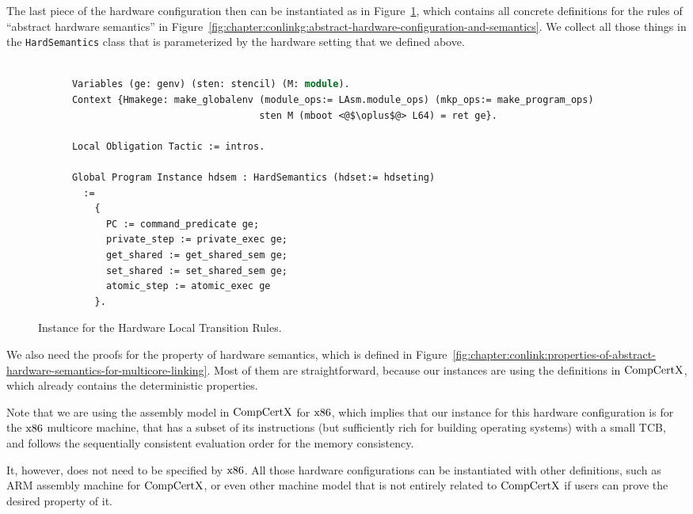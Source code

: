 The last piece of the hardware configuration then can be instantiated as in Figure~\ref{fig:chapter:certikos:hardware-local-step-transition-rules},
which contains all concrete definitions for the rules of ``abstract hardware semantics'' in  Figure~\ref{fig:chapter:conlinkg:abstract-hardware-configuration-and-semantics}.
We collect all those things in the \lstinline$HardSemantics$ class that is parameterized by the hardware setting that we defined above. 
\begin{figure}
\begin{lstlisting}[language=Caml]
      
      Variables (ge: genv) (sten: stencil) (M: module).
      Context {Hmakege: make_globalenv (module_ops:= LAsm.module_ops) (mkp_ops:= make_program_ops) 
                                       sten M (mboot <@$\oplus$@> L64) = ret ge}.
      
      Local Obligation Tactic := intros.
      
      Global Program Instance hdsem : HardSemantics (hdset:= hdseting)
        :=
          {
            PC := command_predicate ge;
            private_step := private_exec ge;
            get_shared := get_shared_sem ge;
            set_shared := set_shared_sem ge;
            atomic_step := atomic_exec ge
          }.
\end{lstlisting}
\caption{Instance for the Hardware Local Transition Rules.}
\label{fig:chapter:certikos:hardware-local-step-transition-rules}
\end{figure}
We also need the proofs for the property of hardware semantics, which is defined in Figure~\ref{fig:chapter:conlink:properties-of-abstract-hardware-semantics-for-multicore-linking}. 
Most of them are straightforward, because our instances are using the definitions in $\mathrm{CompCertX}$,
which already contains the deterministic properties. 

Note that we are using the assembly model in $\mathrm{CompCertX}$ for $\mathrm{x86}$, which implies that 
our instance for this hardware configuration is 
for the $\mathrm{x86}$ multicore machine,
that has a subset of its instructions (but sufficiently rich for building operating systems) with a small TCB, 
and follows the sequentially consistent evaluation order for the memory consistency. 

It, however, does not need to be specified by $\mathrm{x86}$. 
All  those hardware configurations can be instantiated with other definitions, such as ARM assembly machine for $\mathrm{CompCertX}$, 
or even other machine model that is not entirely related to $\mathrm{CompCertX}$ if users can prove the desired property of it. 

